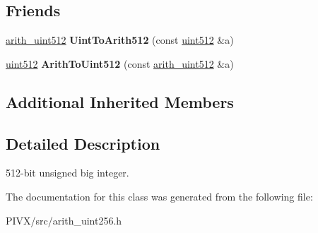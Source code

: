 \subsection*{Friends}
\begin{DoxyCompactItemize}
\item 
\mbox{\label{classarith__uint512_a3cd9a395c2925fc2a9f68c06af05537a}} 
\mbox{\hyperlink{classarith__uint512}{arith\+\_\+uint512}} {\bfseries Uint\+To\+Arith512} (const \mbox{\hyperlink{classuint512}{uint512}} \&a)
\item 
\mbox{\label{classarith__uint512_aadfa4fe6eac47d5d53ec9532e9e35c01}} 
\mbox{\hyperlink{classuint512}{uint512}} {\bfseries Arith\+To\+Uint512} (const \mbox{\hyperlink{classarith__uint512}{arith\+\_\+uint512}} \&a)
\end{DoxyCompactItemize}
\subsection*{Additional Inherited Members}


\subsection{Detailed Description}
512-\/bit unsigned big integer. 

The documentation for this class was generated from the following file\+:\begin{DoxyCompactItemize}
\item 
P\+I\+V\+X/src/arith\+\_\+uint256.\+h\end{DoxyCompactItemize}
